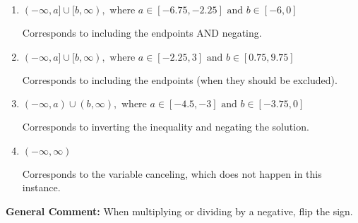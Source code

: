\documentclass{extbook}[14pt]
\begin{document}
\begin{enumerate}
{\begin{enumerate}[label=\Alph*.]
 * Correct option.
\item \( (-\infty, a] \cup [b, \infty), \text{ where } a \in [-6.75, -2.25] \text{ and } b \in [-6, 0] \)

Corresponds to including the endpoints AND negating.
\item \( (-\infty, a] \cup [b, \infty), \text{ where } a \in [-2.25, 3] \text{ and } b \in [0.75, 9.75] \)

Corresponds to including the endpoints (when they should be excluded).
\item \( (-\infty, a) \cup (b, \infty), \text{ where } a \in [-4.5, -3] \text{ and } b \in [-3.75, 0] \)

Corresponds to inverting the inequality and negating the solution.
\item \( (-\infty, \infty) \)

Corresponds to the variable canceling, which does not happen in this instance.
\end{enumerate}

\textbf{General Comment:} When multiplying or dividing by a negative, flip the sign.
}
\end{enumerate}
\end{document}
